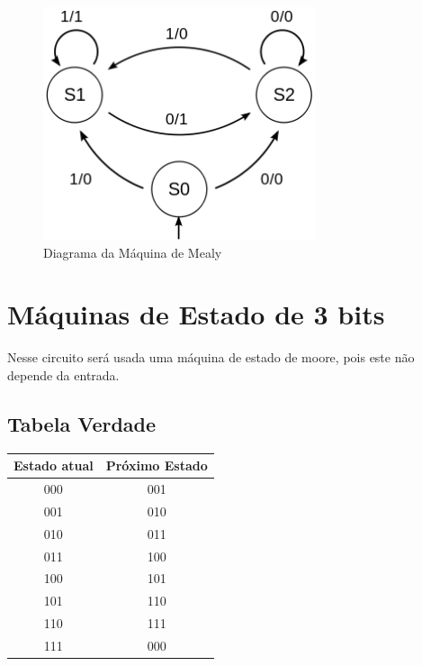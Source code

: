 \documentclass{article}
\begin{document}
            \begin{figure} [H] 
                \includegraphics[width=8cm]{fsm-mealy-diagram.png}
                \caption{Diagrama da Máquina de Mealy}
                \label{fig:fsm-mealy-diagram}
            \end{figure}

    \section{Máquinas de Estado de 3 bits}

        Nesse circuito será usada uma máquina de estado de moore, pois este não depende da entrada.

        \subsection{Tabela Verdade}

            \begin{tabular}{||c c||}
                \hline
                Estado atual    &   Próximo Estado  \\
                \hline\hline
                000             &   001             \\
                001             &   010             \\
                010             &   011             \\
                011             &   100             \\
                100             &   101             \\
                101             &   110             \\
                110             &   111             \\
                111             &   000             \\
                \hline
            \end{tabular}
\end{document}
